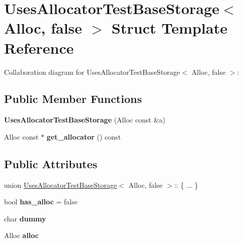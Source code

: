 \hypertarget{struct_uses_allocator_test_base_storage_3_01_alloc_00_01false_01_4}{}\section{Uses\+Allocator\+Test\+Base\+Storage$<$ Alloc, false $>$ Struct Template Reference}
\label{struct_uses_allocator_test_base_storage_3_01_alloc_00_01false_01_4}


Collaboration diagram for Uses\+Allocator\+Test\+Base\+Storage$<$ Alloc, false $>$\+:
\subsection*{Public Member Functions}
\begin{DoxyCompactItemize}
\item 
\mbox{\label{struct_uses_allocator_test_base_storage_3_01_alloc_00_01false_01_4_a1234ed344ef43a265d6e7faa91a8c283}} 
{\bfseries Uses\+Allocator\+Test\+Base\+Storage} (Alloc const \&a)
\item 
\mbox{\label{struct_uses_allocator_test_base_storage_3_01_alloc_00_01false_01_4_a5c66dd7b7d7a811c8313ee22eb3d01d3}} 
Alloc const  $\ast$ {\bfseries get\+\_\+allocator} () const
\end{DoxyCompactItemize}
\subsection*{Public Attributes}
\begin{DoxyCompactItemize}
\item 
\mbox{\label{struct_uses_allocator_test_base_storage_3_01_alloc_00_01false_01_4_aca477fd861b7a1d565c3d8ad45a57d55}} 
union \mbox{\hyperlink{struct_uses_allocator_test_base_storage}{Uses\+Allocator\+Test\+Base\+Storage}}$<$ Alloc, false $>$\+:: \{ ... \}  
\item 
\mbox{\label{struct_uses_allocator_test_base_storage_3_01_alloc_00_01false_01_4_ad507d8171ac8fb10630c4fe72417ead1}} 
bool {\bfseries has\+\_\+alloc} = false
\item 
\mbox{\label{struct_uses_allocator_test_base_storage_3_01_alloc_00_01false_01_4_ac7997a86fe2af622ca0b69c8c6b28a3d}} 
char {\bfseries dummy}
\item 
\mbox{\label{struct_uses_allocator_test_base_storage_3_01_alloc_00_01false_01_4_a40057477a20d0ebb5f93032a032975f6}} 
Alloc {\bfseries alloc}
\end{DoxyCompactItemize}


